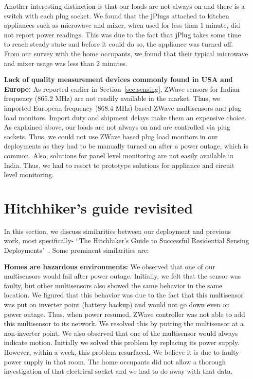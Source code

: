 \documentclass[10pt]{sensys-proc}
\newcommand{\secref}[1]{Section~\ref{#1}}
\begin{document}
\noindent Another interesting distinction is that our loads are not always on and there is a switch with each plug socket. We found that the jPlugs attached to kitchen appliances such as microwave and mixer, when used for less than 1 minute, did not report power readings. This was due to the fact that jPlug takes some time to reach steady state and before it could do so, the appliance was turned off. 
From our survey with the home occupants, we found that their typical microwave and mixer usage was less than 2 minutes.

\noindent \textbf{Lack of quality measurement devices commonly found in USA and Europe:} As reported earlier in \secref{sec:sensing}, ZWave sensors for Indian frequency (865.2 MHz) are not readily available in the market. Thus, we imported European frequency (868.4 MHz) based ZWave multisensors and plug load monitors. Import duty and shipment delays make them an expensive choice. As explained above, our loads are not always on and are controlled via plug sockets. Thus, we could not use ZWave based plug load monitors in our deployments as they had to be manually turned on after a power outage, which is common. Also, solutions for panel level monitoring are not easily available in India.
Thus, we had to resort to prototype solutions for appliance and circuit level monitoring.

\section{Hitchhiker's guide revisited}
\label{sec:common}
In this section, we discuss similarities between our deployment and previous work, most specifically- ``The Hitchhiker’s Guide to Successful Residential Sensing Deployments"~\cite{hitchhiker_residential}. Some prominent similarities are:

\noindent \textbf{Homes are hazardous environments:} We observed that one of our multisensors would fail after power outage. Initially, we felt that the sensor was faulty, but other multisensors also showed the same behavior in the same location. We figured that this behavior was due to the fact that this multisensor was put on inverter point (battery backup) and would not go down even on power outage. Thus, when power resumed, ZWave controller was not able to add this multisensor to its network. We resolved this by putting the multisensor at a non-inverter point. We also observed that one of the multisensor would always indicate motion. Initially we solved this problem by replacing its power supply. However, within a week, this problem resurfaced. We believe it is due to faulty power supply in that room. The home occupants did not allow a thorough investigation of that electrical socket and we had to do away with that data.
\end{document}
